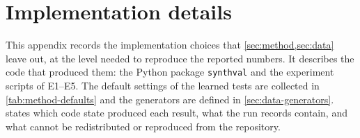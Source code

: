 \section{Implementation details}\label{app:impl}

This appendix records the implementation choices that \cref{sec:method,sec:data} leave out, at
the level needed to reproduce the reported numbers. It describes the code that produced them:
the Python package \texttt{synthval} and the experiment scripts of E1--E5. The default settings
of the learned tests are collected in \cref{tab:method-defaults} and the generators are defined
in \cref{sec:data-generators}.  states which code state produced each
result, what the run records contain, and what cannot be redistributed or reproduced from the
repository.

